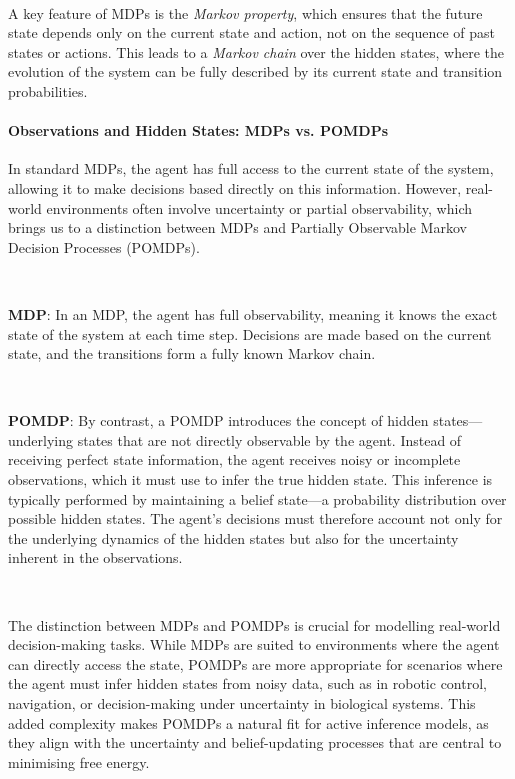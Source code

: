 \documentclass{article}
\begin{document}
\

A key feature of MDPs is the \textit{Markov property}, which ensures that the future state depends only on the current state and action, not on the sequence of past states or actions. This leads to a \textit{Markov chain} over the hidden states, where the evolution of the system can be fully described by its current state and transition probabilities.

\paragraph{Observations and Hidden States: MDPs vs. POMDPs}

In standard MDPs, the agent has full access to the current state of the system, allowing it to make decisions based directly on this information. However, real-world environments often involve uncertainty or partial observability, which brings us to a distinction between MDPs and Partially Observable Markov Decision Processes (POMDPs).

\

\textbf{MDP}: In an MDP, the agent has full observability, meaning it knows the exact state of the system at each time step. Decisions are made based on the current state, and the transitions form a fully known Markov chain.

\

\textbf{POMDP}: By contrast, a POMDP introduces the concept of hidden states—underlying states that are not directly observable by the agent. Instead of receiving perfect state information, the agent receives noisy or incomplete observations, which it must use to infer the true hidden state. This inference is typically performed by maintaining a belief state—a probability distribution over possible hidden states. The agent’s decisions must therefore account not only for the underlying dynamics of the hidden states but also for the uncertainty inherent in the observations.

\

The distinction between MDPs and POMDPs is crucial for modelling real-world decision-making tasks. While MDPs are suited to environments where the agent can directly access the state, POMDPs are more appropriate for scenarios where the agent must infer hidden states from noisy data, such as in robotic control, navigation, or decision-making under uncertainty in biological systems. This added complexity makes POMDPs a natural fit for active inference models, as they align with the uncertainty and belief-updating processes that are central to minimising free energy.
\end{document}
